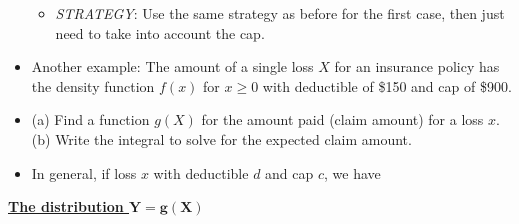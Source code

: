 \documentclass{article}
\newcommand{\bu}[1]{\textbf{\ul{#1}}}				%
\begin{document}
\begin{itemize}
\begin{itemize}
        \item \textit{STRATEGY}: Use the same strategy as before for the first case, then just need to take into account the cap.\vspace{200pt} 
    \end{itemize}
    \item Another example: The amount of a single loss $X$ for an insurance policy has the density function $f(x)$ for $x \ge 0$ with deductible of \$150 and cap of \$900.
    \item[] (a) Find a function $g(X)$ for the amount paid (claim amount) for a loss $x$.\\ (b) Write the integral to solve for the expected claim amount.\vspace{150pt}
    \item In general, if loss $x$ with deductible $d$ and cap $c$, we have\vspace{30pt}
\end{itemize}\newpage

\bu{The distribution $\boldsymbol{Y = g(X)}$}\bigskip
\end{document}
